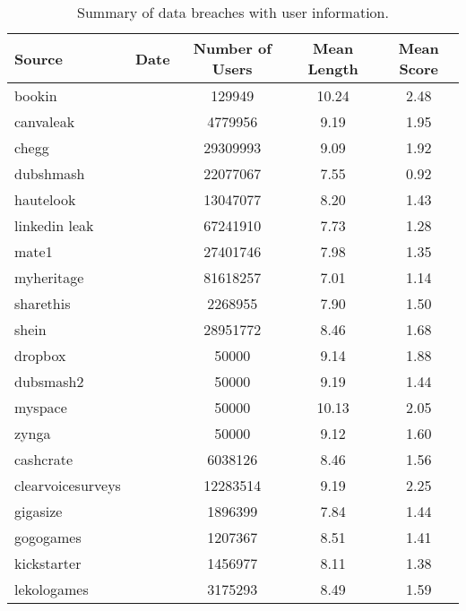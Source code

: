 \begin{table*}[h!]
\centering
\begin{tabular}{|l|c|c|c|c|}
\hline
\textbf{Source} & \textbf{Date} & \textbf{Number of Users} & \textbf{Mean Length} & \textbf{Mean Score} \\
\hline
bookin &  & 129949 & 10.24 & 2.48 \\
canvaleak &  & 4779956 & 9.19 & 1.95 \\
chegg &  & 29309993 & 9.09 & 1.92 \\
dubshmash &  & 22077067 & 7.55 & 0.92 \\
hautelook &  & 13047077 & 8.20 & 1.43 \\
linkedin leak &  & 67241910 & 7.73 & 1.28 \\
mate1 &  & 27401746 & 7.98 & 1.35 \\
myheritage &  & 81618257 & 7.01 & 1.14 \\
sharethis &  & 2268955 & 7.90 & 1.50 \\
shein &  & 28951772 & 8.46 & 1.68 \\
dropbox &  & 50000 & 9.14 & 1.88 \\
dubsmash2 &  & 50000 & 9.19 & 1.44 \\
myspace &  & 50000 & 10.13 & 2.05 \\
zynga &  & 50000 & 9.12 & 1.60 \\
cashcrate &  & 6038126 & 8.46 & 1.56 \\
clearvoicesurveys &  & 12283514 & 9.19 & 2.25 \\
gigasize &  & 1896399 & 7.84 & 1.44 \\
gogogames &  & 1207367 & 8.51 & 1.41 \\
kickstarter &  & 1456977 & 8.11 & 1.38 \\
lekologames &  & 3175293 & 8.49 & 1.59 \\
\hline
\end{tabular}
\caption{Summary of data breaches with user information.}
\end{table*}
